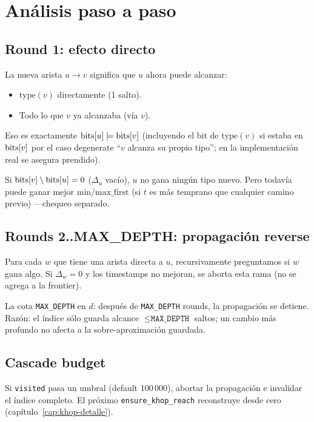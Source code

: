 \section{Análisis paso a paso}

\subsection{Round 1: efecto directo}

La nueva arista \(u \to v\) significa que \(u\) ahora puede
alcanzar:
\begin{itemize}
    \item \(\mathrm{type}(v)\) directamente (1 salto).
    \item Todo lo que \(v\) ya alcanzaba (vía \(v\)).
\end{itemize}

\noindent
Eso es exactamente \(\mathrm{bits}[u] \mathrel{|}\!= \mathrm{bits}[v]\) (incluyendo
el bit de \(\mathrm{type}(v)\) si estaba en \(\mathrm{bits}[v]\) por el
caso degenerate ``\(v\) alcanza su propio tipo''; en la
implementación real se asegura prendido).

Si \(\mathrm{bits}[v] \setminus \mathrm{bits}[u] = 0\) (\(\Delta_u\) vacío), \(u\)
no gana ningún tipo nuevo. Pero todavía puede ganar mejor
\(\mathrm{min/max\_first}\) (si \(t\) es más temprano que cualquier
camino previo) ---chequeo separado.

\subsection{Rounds 2..MAX\_DEPTH: propagación reverse}

Para cada \(w\) que tiene una arista directa a \(u\), recursivamente
preguntamos si \(w\) gana algo. Si \(\Delta_w = 0\) y los timestamps
no mejoran, se aborta esta rama (no se agrega a la frontier).

La cota \texttt{MAX\_DEPTH} en \(d\): después de
\texttt{MAX\_DEPTH} rounds, la propagación se detiene. Razón: el
índice sólo guarda alcance \(\leq \texttt{MAX\_DEPTH}\) saltos;
un cambio más profundo no afecta a la sobre-aproximación
guardada.

\subsection{Cascade budget}

Si \texttt{visited} pasa un umbral (default 100\,000), abortar la
propagación e invalidar el índice completo. El próximo
\texttt{ensure\_khop\_reach} reconstruye desde cero
(capítulo~\ref{cap:khop-detalle}).

